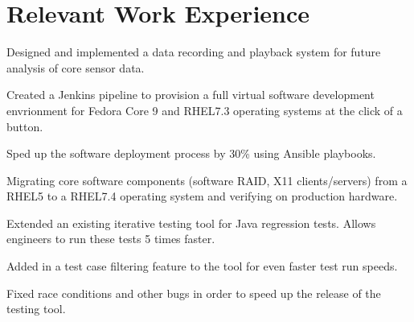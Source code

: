 \documentclass[letterpaper]{deedy-resume} %
\begin{document}
\begin{minipage}[t]{0.66\textwidth} %


\section{Relevant Work Experience}


\vspace{\topsep} %

\begin{tightitemize}
\item Designed and implemented a data recording and playback system for future analysis of core sensor data.
\item Created a Jenkins pipeline to provision a full virtual software development envrionment for Fedora Core 9 and RHEL7.3 operating systems at the click of a button.
\item Sped up the software deployment process by 30\% using Ansible playbooks.
\item Migrating core software components (software RAID, X11 clients/servers) from a RHEL5 to a RHEL7.4 operating system and verifying on production hardware.
\end{tightitemize}

\sectionspace %




\begin{tightitemize}
\item Extended an existing iterative testing tool for Java regression tests. Allows engineers to run these tests 5 times faster.
\item Added in a test case filtering feature to the tool for even faster test run speeds.
\item Fixed race conditions and other bugs in order to speed up the release of the testing tool.
\end{tightitemize}


\end{minipage}
\end{document}
